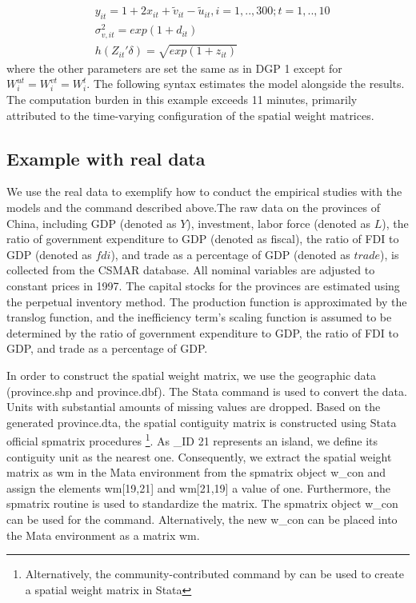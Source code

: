 \begin{equation}\label{dgp3}
 	 \begin{aligned}
 		& y_{it} = 1+2x_{it} + \tilde{v}_{it}-\tilde{u}_{it}, i=1,..,300; t=1,..,10  \\
 		& \sigma_{v,it}^2 = exp(1+d_{it})  \\
 		&  h(Z_{it}'\delta) = \sqrt{exp(1+z_{it})}
 	\end{aligned}
 \end{equation}
 where the other parameters are set the same as in DGP 1 except for $W_{i}^{ut}=W_{i}^{vt}=W_{i}^t$. The following syntax estimates the model alongside the results. The computation burden in this example exceeds 11 minutes, primarily attributed to the time-varying configuration of the spatial weight matrices.
 
 \begin{stlog}
 	
 \end{stlog}
 
\subsection{Example with real data} 
\vspace{5pt}
We use the real data to exemplify how to conduct the empirical studies with the models and the command  described above.The raw data on the provinces of China, including GDP (denoted as $Y$), investment, labor force (denoted as $L$), the ratio of government expenditure to GDP (denoted as fiscal), the ratio of FDI to GDP (denoted as $fdi$), and trade as a percentage of GDP (denoted as $trade$), is collected from the CSMAR database. All nominal variables are adjusted to constant prices in 1997.  The capital stocks for the provinces are estimated using the perpetual inventory method. The production function is approximated by the translog function, and the inefficiency term's scaling function is assumed to be determined by the ratio of government expenditure to GDP, the ratio of FDI to GDP, and trade as a percentage of GDP. 

 \begin{stlog}
	
\end{stlog}

In order to construct the spatial weight matrix,  we use the geographic data (province.shp and province.dbf). The Stata command  is used to convert the data. Units with substantial amounts of missing values are dropped. Based on the generated province.dta, the spatial contiguity matrix is constructed using Stata official spmatrix procedures \footnote{Alternatively, the community-contributed command  by \cite{Wilner2010} can be used to create a spatial weight matrix in Stata}. As \_ID 21 represents an island, we define its contiguity unit as the nearest one. Consequently, we extract the spatial weight matrix as wm in the Mata environment from the spmatrix object w\_con and assign the elements wm[19,21] and wm[21,19] a value of one. Furthermore, the spmatrix routine is used to standardize the matrix. The spmatrix object w\_con can be used for the  command. Alternatively, the new w\_con can be placed into the Mata environment as a matrix wm.

